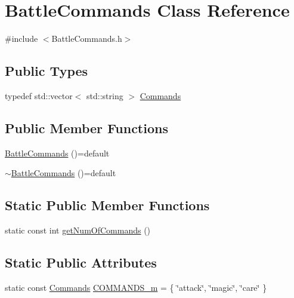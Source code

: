 \hypertarget{class_battle_commands}{}\section{Battle\+Commands Class Reference}
\label{class_battle_commands}


{\ttfamily \#include $<$Battle\+Commands.\+h$>$}

\subsection*{Public Types}
\begin{DoxyCompactItemize}
\item 
typedef std\+::vector$<$ std\+::string $>$ \hyperlink{class_battle_commands_ad7112c7a7d768a36302631667bd62b17}{Commands}
\end{DoxyCompactItemize}
\subsection*{Public Member Functions}
\begin{DoxyCompactItemize}
\item 
\hyperlink{class_battle_commands_a7e326bb12b3895ee69ce6120811f6d2a}{Battle\+Commands} ()=default
\item 
\hyperlink{class_battle_commands_aa58510d9aa1c4a2f14c35c095e32f212}{$\sim$\+Battle\+Commands} ()=default
\end{DoxyCompactItemize}
\subsection*{Static Public Member Functions}
\begin{DoxyCompactItemize}
\item 
static const int \hyperlink{class_battle_commands_a545df551d5dd5ec5212a4c2d32a125e9}{get\+Num\+Of\+Commands} ()
\end{DoxyCompactItemize}
\subsection*{Static Public Attributes}
\begin{DoxyCompactItemize}
\item 
static const \hyperlink{class_battle_commands_ad7112c7a7d768a36302631667bd62b17}{Commands} \hyperlink{class_battle_commands_ad187150249ca899f0f6cd16cd8052d0f}{C\+O\+M\+M\+A\+N\+D\+S\+\_\+m} = \{ \char`\"{}attack\char`\"{}, \char`\"{}magic\char`\"{}, \char`\"{}care\char`\"{} \}
\end{DoxyCompactItemize}


